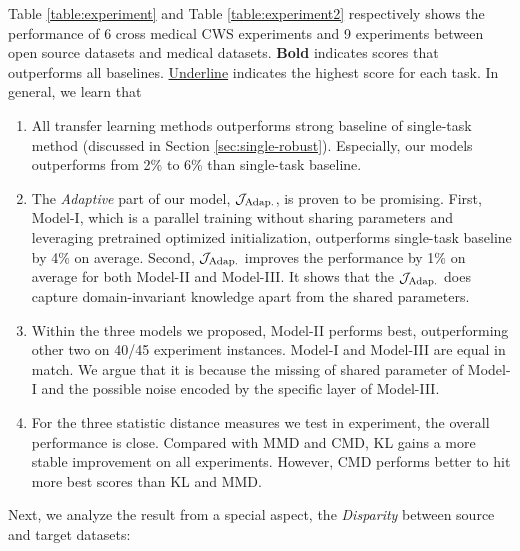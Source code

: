 Table \ref{table:experiment} and Table \ref{table:experiment2} respectively shows the performance of 6 cross medical CWS experiments and 9 experiments between open source datasets and medical datasets. 
\textbf{Bold} indicates scores that outperforms all baselines. \underline{Underline} indicates the highest score for each task.
In general, we learn that

\begin{enumerate}
\item All transfer learning methods outperforms strong baseline of single-task method (discussed in Section \ref{sec:single-robust}). Especially, our models outperforms from 2\% to 6\% than single-task baseline.
\item The \textit{Adaptive} part of our model, $\mathcal{J}_\textnormal{Adap.}$, is proven to be promising. First,  Model-\RN{1}, which is a parallel training without sharing parameters and leveraging pretrained optimized initialization, outperforms single-task baseline by 4\% on average. Second, $\mathcal{J}_\textnormal{Adap.}$ improves the performance by 1\% on average for both Model-\RN{2} and Model-\RN{3}. 
It shows that the $\mathcal{J}_\textnormal{Adap.}$ does capture 
domain-invariant knowledge apart from the shared parameters. 
\item Within the three models we proposed, Model-\RN{2} performs best, outperforming other two on 40/45 experiment instances. Model-\RN{1} and Model-\RN{3} are equal in match. We argue that it is because the missing of shared parameter of Model-\RN{1} and the possible noise encoded by the specific layer of Model-\RN{3}.
\item For the three statistic distance measures we test in experiment, the overall performance is close. Compared with MMD and CMD, KL gains a more stable improvement on all experiments. However, CMD performs better to hit more best scores than KL and MMD.
\end{enumerate}

Next, we analyze the result from a special aspect, the \textit{Disparity} between source and target datasets:

